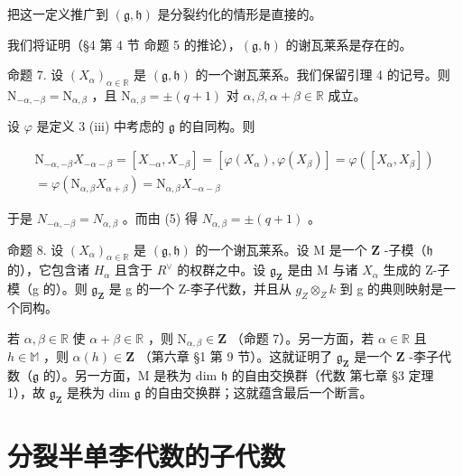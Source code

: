 把这一定义推广到 \((\mathfrak{g},\mathfrak{h})\) 是分裂约化的情形是直接的。

我们将证明（§4 第 4 节 命题 5 的推论），\((\mathfrak{g},\mathfrak{h})\) 的谢瓦莱系是存在的。

命题 7. 设 \((X_{\alpha})_{\alpha \in \mathbb{R}}\) 是 \((\mathfrak{g},\mathfrak{h})\) 的一个谢瓦莱系。我们保留引理 4 的记号。则 \(\mathrm{N}_{-\alpha, - \beta} = \mathrm{N}_{\alpha ,\beta}\) ，且 \(\mathrm{N}_{\alpha ,\beta} = \pm (q + 1)\) 对 \(\alpha ,\beta ,\alpha +\beta \in \mathbb{R}\) 成立。

设 \(\varphi\) 是定义 3 (iii) 中考虑的 \(\mathfrak{g}\) 的自同构。则

\[
\begin{array}{r} \mathrm{N} _ {- \alpha , - \beta} X _ {- \alpha - \beta} = [ X _ {- \alpha}, X _ {- \beta} ] = [ \varphi (X _ {\alpha}), \varphi (X _ {\beta}) ] = \varphi ([ X _ {\alpha}, X _ {\beta} ]) \\ = \varphi (\mathrm{N} _ {\alpha , \beta} X _ {\alpha + \beta}) = \mathrm{N} _ {\alpha , \beta} X _ {- \alpha - \beta} \end{array}
\]

于是 \(N_{-\alpha,-\beta}=N_{\alpha,\beta}\) 。而由 (5) 得 \(N_{\alpha,\beta}=\pm(q+1)\) 。

命题 8. 设 \((X_{\alpha})_{\alpha \in \mathbb{R}}\) 是 \((\mathfrak{g},\mathfrak{h})\) 的一个谢瓦莱系。设 \(\mathrm{M}\) 是一个 \(\mathbf{Z}\) -子模（\(\mathfrak{h}\) 的），它包含诸 \(H_{\alpha}\) 且含于 \(R^{\vee}\) 的权群之中。设 \(\mathfrak{g}_{\mathbf{Z}}\) 是由 M 与诸 \(X_{\alpha}\) 生成的 Z-子模（g 的）。则 \(\mathfrak{g}_{\mathbf{Z}}\) 是 g 的一个 Z-李子代数，并且从 \(g_{Z} \otimes_{Z} k\) 到 g 的典则映射是一个同构。

若 \(\alpha, \beta \in \mathbb{R}\) 使 \(\alpha + \beta \in \mathbb{R}\) ，则 \(\mathrm{N}_{\alpha, \beta} \in \mathbf{Z}\) （命题 7）。另一方面，若 \(\alpha \in \mathbb{R}\) 且 \(h \in \mathbb{M}\) ，则 \(\alpha(h) \in \mathbf{Z}\) （第六章 §1 第 9 节）。这就证明了 \(\mathfrak{g}_{\mathbf{Z}}\) 是一个 \(\mathbf{Z}\) -李子代数（\(\mathfrak{g}\) 的）。另一方面，M 是秩为 dim \(\mathfrak{h}\) 的自由交换群（代数 第七章 §3 定理 1），故 \(\mathfrak{g}_{\mathbf{Z}}\) 是秩为 dim \(\mathfrak{g}\) 的自由交换群；这就蕴含最后一个断言。

\section{分裂半单李代数的子代数}

